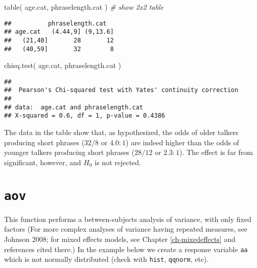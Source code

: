 \documentclass[
]{book}
\newenvironment{Shaded}{\begin{snugshade}}{\end{snugshade}}
\newcommand{\CommentTok}[1]{\textcolor[rgb]{0.56,0.35,0.01}{\textit{#1}}}
\newcommand{\FunctionTok}[1]{\textcolor[rgb]{0.00,0.00,0.00}{#1}}
\newcommand{\NormalTok}[1]{#1}
\begin{document}
\begin{Shaded}
\begin{Highlighting}[]
\FunctionTok{table}\NormalTok{( age.cat, phraselength.cat ) }\CommentTok{\# show 2x2 table}
\end{Highlighting}
\end{Shaded}

\begin{verbatim}
##          phraselength.cat
## age.cat   (4.44,9] (9,13.6]
##   (21,40]       28       12
##   (40,59]       32        8
\end{verbatim}

\begin{Shaded}
\begin{Highlighting}[]
\FunctionTok{chisq.test}\NormalTok{( age.cat, phraselength.cat ) }
\end{Highlighting}
\end{Shaded}

\begin{verbatim}
## 
##  Pearson's Chi-squared test with Yates' continuity correction
## 
## data:  age.cat and phraselength.cat
## X-squared = 0.6, df = 1, p-value = 0.4386
\end{verbatim}

The data in the table show that, as hypothesized, the odds of older talkers producing short phrases (\(32/8\) or \(4.0:1\)) are indeed higher than the odds of younger talkers producing short phrases (\(28/12\) or \(2.3:1\)). The effect is far from significant, however, and \(H_0\) is not rejected.

\hypertarget{aov}{%
\section{\texorpdfstring{\texttt{aov}}{aov}}\label{aov}}

This function performs a between-subjects analysis of variance, with
only fixed factors \citep{john08} (For more complex
analyses of variance having repeated measures, see Johnson 2008; for mixed effects models, see Chapter \ref{ch-mixedeffects} and references cited there.)
In the example below we create a
response variable \texttt{aa} which is not normally distributed
(check
with \texttt{hist}, \texttt{qqnorm}, etc).\\
\end{document}
